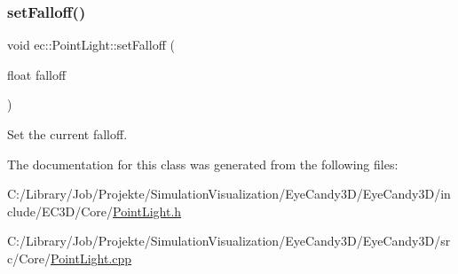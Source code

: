 \mbox{\label{classec_1_1_point_light_a64949f08f93b178b110f9c366d72ce89}} 
\subsubsection{\texorpdfstring{set\+Falloff()}{setFalloff()}}
{\footnotesize\ttfamily void ec\+::\+Point\+Light\+::set\+Falloff (\begin{DoxyParamCaption}\item[{float}]{falloff }\end{DoxyParamCaption})}



Set the current falloff. 



The documentation for this class was generated from the following files\+:\begin{DoxyCompactItemize}
\item 
C\+:/\+Library/\+Job/\+Projekte/\+Simulation\+Visualization/\+Eye\+Candy3\+D/\+Eye\+Candy3\+D/include/\+E\+C3\+D/\+Core/\mbox{\hyperlink{_point_light_8h}{Point\+Light.\+h}}\item 
C\+:/\+Library/\+Job/\+Projekte/\+Simulation\+Visualization/\+Eye\+Candy3\+D/\+Eye\+Candy3\+D/src/\+Core/\mbox{\hyperlink{_point_light_8cpp}{Point\+Light.\+cpp}}\end{DoxyCompactItemize}
